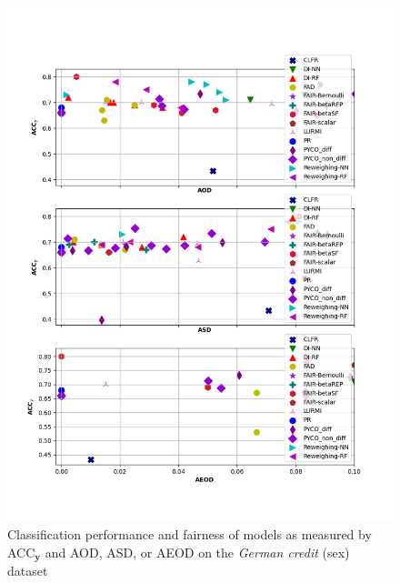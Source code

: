 \documentclass[preprint,12pt]{elsarticle}
\begin{document}
\begin{figure}
	\center
	\includegraphics[angle=0, width=1\textwidth]{Ger_sex_all_ACC.png}
	\captionsetup{justification=centering}
	\caption{Classification performance and fairness of models as measured by ACC$_\mathbf{y}$ and AOD, ASD, or AEOD on the \textit{German credit} (sex) dataset}
	\label{fig:Ger_sex all-acc}
	\vskip -0.2in
\end{figure}
\end{document}
